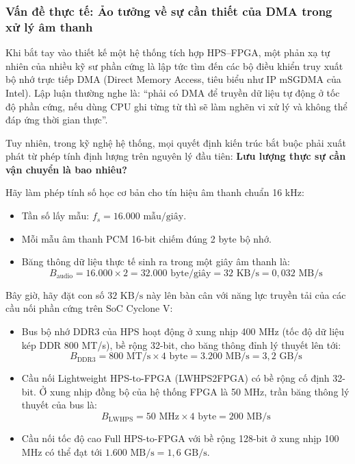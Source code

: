 \subsubsection*{Vấn đề thực tế: Ảo tưởng về sự cần thiết của DMA trong xử lý âm thanh}
Khi bắt tay vào thiết kế một hệ thống tích hợp HPS–FPGA, một phản xạ tự nhiên của nhiều kỹ sư phần cứng là lập tức tìm đến các bộ điều khiển truy xuất bộ nhớ trực tiếp DMA (Direct Memory Access, tiêu biểu như IP mSGDMA của Intel). Lập luận thường nghe là: ``phải có DMA để truyền dữ liệu tự động ở tốc độ phần cứng, nếu dùng CPU ghi từng từ thì sẽ làm nghẽn vi xử lý và không thể đáp ứng thời gian thực''.

Tuy nhiên, trong kỹ nghệ hệ thống, mọi quyết định kiến trúc bắt buộc phải xuất phát từ phép tính định lượng trên nguyên lý đầu tiên: \textbf{Lưu lượng thực sự cần vận chuyển là bao nhiêu?}

Hãy làm phép tính số học cơ bản cho tín hiệu âm thanh chuẩn 16 kHz:
\begin{itemize}[leftmargin=1.5em, itemsep=2pt]
    \item Tần số lấy mẫu: $f_s = 16.000\text{ mẫu/giây}$.
    \item Mỗi mẫu âm thanh PCM 16-bit chiếm đúng 2 byte bộ nhớ.
    \item Băng thông dữ liệu thực tế sinh ra trong một giây âm thanh là:
    \begin{equation}
    B_{\text{audio}} = 16.000 \times 2 = 32.000\text{ byte/giây} = 32\text{ KB/s} = 0{,}032\text{ MB/s}
    \end{equation}
\end{itemize}

Bây giờ, hãy đặt con số $32\text{ KB/s}$ này lên bàn cân với năng lực truyền tải của các cầu nối phần cứng trên SoC Cyclone V:
\begin{itemize}[leftmargin=1.5em, itemsep=2pt]
    \item Bus bộ nhớ DDR3 của HPS hoạt động ở xung nhịp 400 MHz (tốc độ dữ liệu kép DDR 800 MT/s), bề rộng 32-bit, cho băng thông đỉnh lý thuyết lên tới:
    \begin{equation}
    B_{\text{DDR3}} = 800\text{ MT/s} \times 4\text{ byte} = 3.200\text{ MB/s} = 3{,}2\text{ GB/s}
    \end{equation}
    \item Cầu nối Lightweight HPS-to-FPGA (LWHPS2FPGA) có bề rộng cố định 32-bit. Ở xung nhịp đồng bộ của hệ thống FPGA là 50 MHz, trần băng thông lý thuyết của bus là:
    \begin{equation}
    B_{\text{LWHPS}} = 50\text{ MHz} \times 4\text{ byte} = 200\text{ MB/s}
    \end{equation}
    \item Cầu nối tốc độ cao Full HPS-to-FPGA với bề rộng 128-bit ở xung nhịp 100 MHz có thể đạt tới $1.600\text{ MB/s} = 1{,}6\text{ GB/s}$.
\end{itemize}

